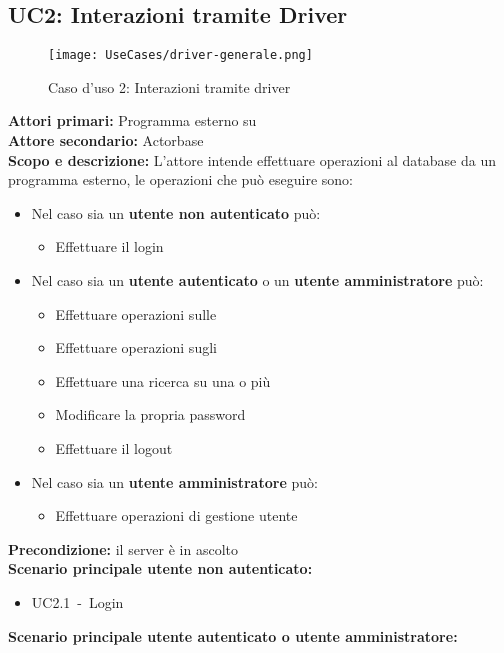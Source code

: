 \documentclass{scalatekids-article}
\begin{document}
\subsection{UC2: Interazioni tramite Driver}
\begin{figure}[H]
  \begin{center}
    \texttt{[image: UseCases/driver-generale.png]}
    \caption*{Caso d'uso 2: Interazioni tramite driver}
  \end{center}
\end{figure}
\textbf{Attori primari:} Programma esterno su \\
\textbf{Attore secondario:} Actorbase\\
\textbf{Scopo e descrizione:} L'attore intende effettuare operazioni al database da un programma  esterno, le operazioni che può eseguire sono:
\begin{itemize}
\item Nel caso sia un \textbf{utente non autenticato} può:
  \begin{itemize}
  \item Effettuare il login
  \end{itemize}
\item Nel caso sia un \textbf{utente autenticato} o un \textbf{utente amministratore} può:
  \begin{itemize}
  \item Effettuare operazioni sulle 
  \item Effettuare operazioni sugli 
  \item Effettuare una ricerca su una o più 
  \item Modificare la propria password
  \item Effettuare il logout
  \end{itemize}
\item Nel caso sia un \textbf{utente amministratore} può:
  \begin{itemize}
  \item Effettuare operazioni di gestione utente
  \end{itemize}
\end{itemize}
\textbf{Precondizione:} il server è in ascolto\\
\textbf{Scenario principale utente non autenticato:}
\begin{itemize}
\item UC2.1\ -\ Login
\end{itemize}
\textbf{Scenario principale utente autenticato o utente amministratore:}
\end{document}

